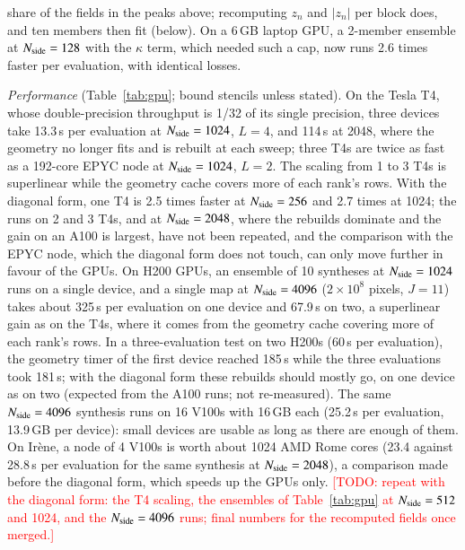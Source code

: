 \documentclass{aa}
\newcommand{\todo}[1]{\textcolor{red}{[TODO: #1]}}
\newcommand{\nside}{N_{\rm side}}
\begin{document}
share of the fields in the peaks above; recomputing $z_n$ and $|z_n|$ per block does, and ten members then fit (below). On a 6\,GB laptop GPU, a 2-member ensemble at $\nside=128$ with the $\kappa$ term, which needed such a cap, now runs 2.6 times faster per evaluation, with identical losses.

\emph{Performance} (Table~\ref{tab:gpu}; bound stencils unless stated). On the Tesla T4, whose double-precision throughput is 1/32 of its single precision, three devices take 13.3\,s per evaluation at $\nside=1024$, $L=4$, and 114\,s at 2048, where the geometry no longer fits and is rebuilt at each sweep; three T4s are twice as fast as a 192-core EPYC node at $\nside=1024$, $L=2$. The scaling from 1 to 3 T4s is superlinear while the geometry cache covers more of each rank's rows. With the diagonal form, one T4 is 2.5 times faster at $\nside=256$ and 2.7 times at 1024; the runs on 2 and 3 T4s, and at $\nside=2048$, where the rebuilds dominate and the gain on an A100 is largest, have not been repeated, and the comparison with the EPYC node, which the diagonal form does not touch, can only move further in favour of the GPUs. On H200 GPUs, an ensemble of 10 syntheses at $\nside=1024$ runs on a single device, and a single map at $\nside=4096$ ($2\times10^8$ pixels, $J=11$) takes about 325\,s per evaluation on one device and 67.9\,s on two, a superlinear gain as on the T4s, where it comes from the geometry cache covering more of each rank's rows. In a three-evaluation test on two H200s (60\,s per evaluation), the geometry timer of the first device reached 185\,s while the three evaluations took 181\,s; with the diagonal form these rebuilds should mostly go, on one device as on two (expected from the A100 runs; not re-measured). The same $\nside=4096$ synthesis runs on 16 V100s with 16\,GB each (25.2\,s per evaluation, 13.9\,GB per device): small devices are usable as long as there are enough of them. On Ir\`ene, a node of 4 V100s is worth about 1024 AMD Rome cores (23.4 against 28.8\,s per evaluation for the same synthesis at $\nside=2048$), a comparison made before the diagonal form, which speeds up the GPUs only. \todo{repeat with the diagonal form: the T4 scaling, the ensembles of Table~\ref{tab:gpu} at $\nside=512$ and 1024, and the $\nside=4096$ runs; final numbers for the recomputed fields once merged.}
\end{document}
